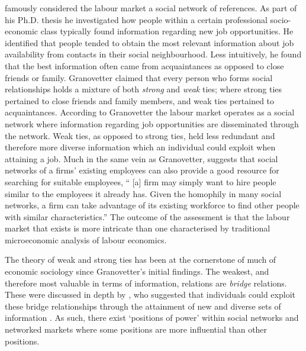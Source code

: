 \citet{Granovetter1973} famously considered the labour market a social network of references. As part of his Ph.D. thesis he investigated how people within a certain professional socio-economic class typically found information regarding new job opportunities. He identified that people tended to obtain the most relevant information about job availability from contacts in their social neighbourhood. Less intuitively, he found that the best information often came from acquaintances as opposed to close friends or family. Granovetter claimed that every person who forms social relationships holds a mixture of both \emph{strong} and \emph{weak} ties; where strong ties pertained to close friends and family members, and weak ties pertained to acquaintances. According to Granovetter the labour market operates as a social network where information regarding job opportunities are disseminated through the network. Weak ties, as opposed to strong ties, held less redundant and therefore more diverse information which an individual could exploit when attaining a job. Much in the same vein as Granovetter, \citet[p.~333]{Jackson2008} suggests that social networks of a firms' existing employees can also provide a good resource for searching for suitable employees, `` [a] firm may simply want to hire people similar to the employees it already has. Given the homophily in many social networks, a firm can take advantage of its existing workforce to find other people with similar characteristics.'' The outcome of the assessment is that the labour market that exists is more intricate than one characterised by traditional microeconomic analysis of labour economics.

The theory of weak and strong ties has been at the cornerstone of much of economic sociology since Granovetter's initial findings. The weakest, and therefore most valuable in terms of information, relations are \emph{bridge} relations. These were discussed in depth by \citet{Burt1992}, who suggested that individuals could exploit these bridge relationships through the attainment of new and diverse sets of information \citep{Burt2004}. As such, there exist `positions of power' within social networks and networked markets where some positions are more influential than other positions.

